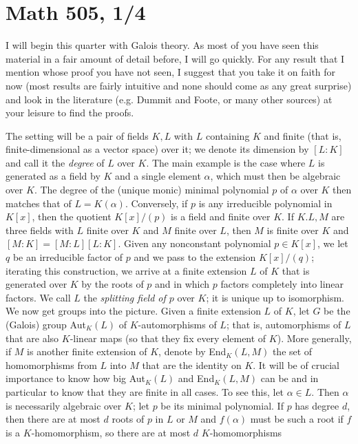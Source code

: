\documentclass[10pt]{article}
\begin{document}
\section*{Math 505, 1/4}

I will begin this quarter with Galois theory. As most of you have seen
this material in a fair amount of detail before, I will go quickly. For
any result that I mention whose proof you have not seen, I suggest that
you take it on faith for now (most results are fairly intuitive and none
should come as any great surprise) and look in the literature (e.g.
Dummit and Foote, or many other sources) at your leisure to find the
proofs.

The setting will be a pair of fields $K,L$ with $L$ containing $K$ and
finite (that is, finite-dimensional as a vector space) over it; we
denote its dimension by $[L:K]$ and call it the {\sl degree} of $L$ over
$K$. The main example is the case where $L$ is generated as a field by
$K$ and a single element $\alpha$, which must then be algebraic over
$K$. The degree of the (unique monic) minimal polynomial $p$ of $\alpha$
over $K$ then matches that of $L=K(\alpha)$. Conversely, if $p$ is any
irreducible polynomial in $K[x]$, then the quotient $K[x]/(p)$ is a
field and finite over $K$. If $K.L,M$ are three fields with $L$ finite
over $K$ and $M$ finite over $L$, then $M$ is finite over $K$ and
$[M:K]=[M:L][L:K]$. Given any nonconstant polynomial $p\in K[x]$, we let
$q$ be an irreducible factor of $p$ and we pass to the extension
$K[x]/(q)$; iterating this construction, we arrive at a finite extension
$L$ of $K$ that is generated over $K$ by the roots of $p$ and in which
$p$ factors completely into linear factors. We call $L$ the {\sl
  splitting field of $p$} over $K$; it is unique up to isomorphism. We
now get groups into the picture. Given a finite extension $L$ of $K$,
let $G$ be the (Galois) group Aut$_K(L)$ of $K$-automorphisms of $L$;
that is, automorphisms of $L$ that are also $K$-linear maps (so that
they fix every element of $K$). More generally, if $M$ is another finite
extension of $K$, denote by End$_K(L,M)$ the set of homomorphisms from
$L$ into $M$ that are the identity on $K$. It will be of crucial
importance to know how big Aut$_K(L)$ and End$_K(L,M)$ can be and in
particular to know that they are finite in all cases. To see this, let
$\alpha\in L$. Then $\alpha$ is necessarily algebraic over $K$; let $p$
be its minimal polynomial. If $p$ has degree $d$, then there are at most
$d$ roots of $p$ in $L$ or $M$ and $f(\alpha)$ must be such a root if
$f$ is a $K$-homomorphism, so there are at most $d$ $K$-homomorphisms
\end{document}
